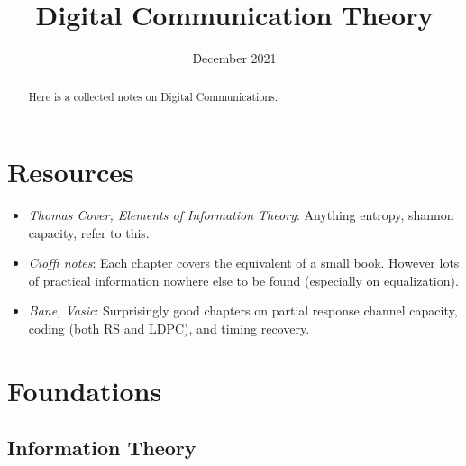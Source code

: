 \documentclass[11pt]{scrartcl}
\begin{document}
	\title{Digital Communication Theory} %
	\date{December 2021}
	\maketitle
	
	\begin{abstract}
		\sffamily\small
		Here is a collected notes on Digital Communications.
	\end{abstract}
	
	\vspace{1em}
	
	\tableofcontents
	\newpage


\section{Resources}
\begin{itemize}
	\item \emph{Thomas Cover, Elements of Information Theory}: Anything entropy, shannon capacity, refer to this.
	
	\item \emph{Cioffi notes}:   Each chapter covers the equivalent of a small book.  However lots of practical information nowhere else to be found (especially on equalization).
	\item \emph{Bane, Vasic}: Surprisingly good chapters on partial response channel capacity, coding (both RS and LDPC), and timing  recovery.
	\end{itemize}

\section{Foundations}

\subsection{Information Theory}
\end{document}
